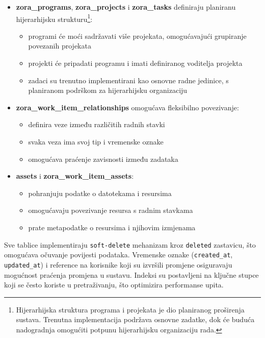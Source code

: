 \documentclass[a4paper,12pt]{article}
\begin{document}
\begin{itemize}
    \item \textbf{zora\_programs}, \textbf{zora\_projects} i \textbf{zora\_tasks} definiraju planiranu hijerarhijsku strukturu\footnote{Hijerarhijska struktura programa i projekata je dio planiranog proširenja sustava. Trenutna implementacija podržava osnovne zadatke, dok će buduća nadogradnja omogućiti potpunu hijerarhijsku organizaciju rada.}:
        \begin{itemize}
            \item programi će moći sadržavati više projekata, omogućavajući grupiranje povezanih projekata
            \item projekti će pripadati programu i imati definiranog voditelja projekta
            \item zadaci su trenutno implementirani kao osnovne radne jedinice, s planiranom podrškom za hijerarhijsku organizaciju
        \end{itemize}
    
    \item \textbf{zora\_work\_item\_relationships} omogućava fleksibilno povezivanje:
        \begin{itemize}
            \item definira veze između različitih radnih stavki
            \item svaka veza ima svoj tip i vremenske oznake
            \item omogućava praćenje zavisnosti između zadataka
        \end{itemize}
    
    \item \textbf{assets} i \textbf{zora\_work\_item\_assets}:
        \begin{itemize}
            \item pohranjuju podatke o datotekama i resursima
            \item omogućavaju povezivanje resursa s radnim stavkama
            \item prate metapodatke o resursima i njihovim izmjenama
        \end{itemize}
\end{itemize}

Sve tablice implementiraju \texttt{soft-delete} mehanizam kroz \texttt{deleted} zastavicu, što omogućava očuvanje povijesti podataka. Vremenske oznake (\texttt{created\_at}, \texttt{updated\_at}) i reference na korisnike koji su izvršili promjene osiguravaju mogućnost praćenja promjena u sustavu. Indeksi su postavljeni na ključne stupce koji se često koriste u pretraživanju, što optimizira performanse upita.
\end{document}
